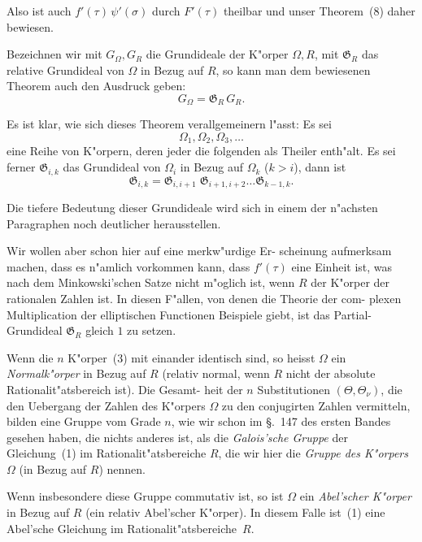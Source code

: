 \documentclass[12pt,a4paper]{article}
\theoremstyle{weber}
\begin{document}
Also ist auch $f'(\tau)\,\psi'(\sigma)$ durch $F'(\tau)$ theilbar und unser
Theorem~(8) daher bewiesen.

Bezeichnen wir mit $G_\varOmega, G_R$ die Grundideale der K"orper $\varOmega, R$,
mit $\mathfrak{G}_R$ das relative Grundideal von $\varOmega$ in Bezug auf $R$, so kann
man dem bewiesenen Theorem auch den Ausdruck geben:
\begin{equation}\label{eq:s159-18}
G_\varOmega = \mathfrak{G}_R\,G_R.
\end{equation}

Es ist klar, wie sich dieses Theorem verallgemeinern l"asst:
Es sei
\[
\varOmega_1, \varOmega_2, \varOmega_3, \dots
\]
eine Reihe von K"orpern, deren jeder die folgenden als Theiler
enth"alt. Es sei ferner $\mathfrak{G}_{i,k}$ das Grundideal von $\varOmega_i$ in Bezug auf
$\varOmega_k$ ($k > i$), dann ist
\begin{equation}\label{eq:s159-19}
\mathfrak{G}_{i,k} = \mathfrak{G}_{i,i+1}\;\mathfrak{G}_{i+1,i+2}\dots\mathfrak{G}_{k-1,k}.
\end{equation}

Die tiefere Bedeutung dieser Grundideale wird sich in einem
der n"achsten Paragraphen noch deutlicher herausstellen.

Wir wollen aber schon hier auf eine merkw"urdige Er-
scheinung aufmerksam machen, dass es n"amlich vorkommen kann,
dass $f'(\tau)$ eine Einheit ist, was nach dem Minkowski'schen
Satze nicht m"oglich ist, wenn $R$ der K"orper der rationalen
Zahlen ist. In diesen F"allen, von denen die Theorie der com-
plexen Multiplication der elliptischen Functionen Beispiele giebt,
ist das Partial-Grundideal $\mathfrak{G}_R$ gleich $1$ zu setzen.

Wenn die $n$ K"orper~(3) mit einander identisch sind, so
heisst $\varOmega$ ein \emph{Normalk"orper} in Bezug auf $R$ (relativ normal,
wenn $R$ nicht der absolute Rationalit"atsbereich ist). Die Gesamt-
heit der $n$ Substitutionen $(\varTheta, \varTheta_\nu)$, die den Uebergang der Zahlen
des K"orpers $\varOmega$ zu den conjugirten Zahlen vermitteln, bilden
eine Gruppe vom Grade $n$, wie wir schon im \S.~147 des ersten
Bandes gesehen haben, die nichts anderes ist, als die \emph{Galois'sche
Gruppe} der Gleichung~(1) im Rationalit"atsbereiche $R$, die wir
hier die \emph{Gruppe des K"orpers $\varOmega$} (in Bezug auf $R$) nennen.

Wenn insbesondere diese Gruppe commutativ ist, so ist $\varOmega$
ein \emph{Abel'scher K"orper} in Bezug auf $R$ (ein relativ Abel'scher
K"orper). In diesem Falle ist~(1) eine Abel'sche Gleichung im
Rationalit"atsbereiche~$R$.
\end{document}
